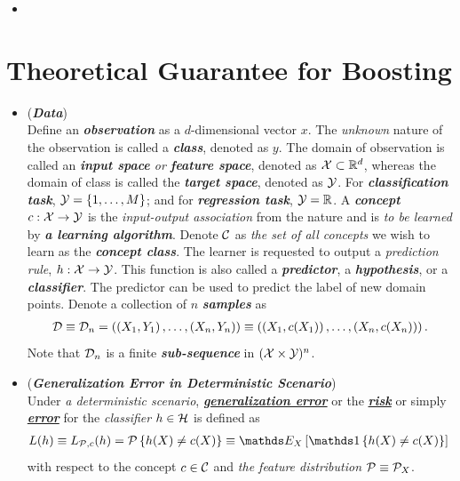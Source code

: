 \documentclass[11pt]{article}
\begin{document}
\begin{itemize}
\item 


\end{itemize}

\section{Theoretical Guarantee for Boosting}
\begin{itemize}
\item \begin{remark} (\emph{\textbf{Data}})\\
Define an \emph{\textbf{observation}} as a $d$-dimensional vector $x$. The \emph{unknown} nature of the observation is called a \emph{\textbf{class}}, denoted as $y$. The domain of observation is called an \emph{\textbf{input space} or \textbf{feature space}}, denoted as ${\mathcal X}\subset {\mathbb R}^{d}$, whereas the domain of class is called the \emph{\textbf{target space}}, denoted as ${\mathcal Y}$. For \emph{\textbf{classification task}}, ${\mathcal Y}= \left\{1,\ldots, M\right\}$; and for \emph{\textbf{regression task}}, ${\mathcal Y} = {\mathbb R}$.   A \emph{\textbf{concept}} $c: {\mathcal X} \rightarrow {\mathcal Y}$ is the \emph{input-output association} from the nature and is \emph{to be learned} by \emph{\textbf{a learning algorithm}}.  Denote ${\mathcal C}$ as \emph{the set of all concepts} we wish to learn as the \emph{\textbf{concept class}}. The learner is requested to output a \emph{prediction rule}, $h : {\mathcal X} \to {\mathcal Y}$. This function is also called a \emph{\textbf{predictor}}, a \emph{\textbf{hypothesis}}, or a \emph{\textbf{classifier}}. The predictor can be used to predict the label of new domain points.  Denote a collection of $n$ \emph{\textbf{samples}} as 
\begin{align*}
{\mathcal D} \equiv {\mathcal D}_n = \left((X_1, Y_1) \,{,}\ldots{,}\, (X_n, Y_n)\right) \equiv  \left((X_1, c(X_1)) \,{,}\ldots{,}\, (X_n, c(X_n))\right) .
\end{align*} Note that ${\mathcal D}_n$ is a finite \emph{\textbf{sub-sequence}} in $({\mathcal X} \times {\mathcal Y})^n$.
\end{remark}

\item \begin{definition} (\emph{\textbf{Generalization Error in Deterministic Scenario}})  \citep{mohri2018foundations}\\
Under \emph{a deterministic scenario}, \underline{\emph{\textbf{generalization error}}} or the \underline{\emph{\textbf{risk}}} or simply \underline{\emph{\textbf{error}}} for the \emph{classifier} $h \in {\mathcal H}$ is defined as
\begin{align}
L(h) \equiv L_{\cP, c}(h)  &= \cP\set{h(X) \neq c(X)} \equiv \E{X}{\ind{h(X)\neq c(X)}}\label{expr: gen_err_determin}
\end{align}
with respect to the concept $c \in {\mathcal C}$ and \emph{the feature distribution} ${\mathcal P} \equiv {\mathcal P}_X$.
\end{definition}


\end{itemize}
\end{document}
